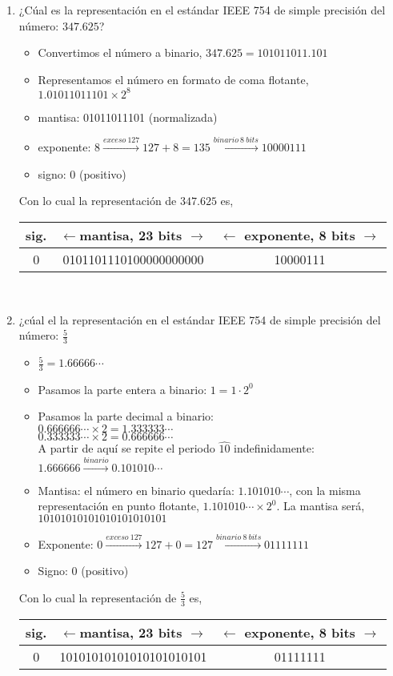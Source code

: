 \begin{enumerate}
\item ¿Cúal es la representación en el estándar IEEE 754 de simple precisión del número: $347.625$?
\begin{itemize}
\item  Convertimos el número a binario, $347.625 = 101011011.101$
\item Representamos el número en formato de coma flotante, $1.01011011101\times 2^{8}$
\item mantisa: 01011011101 (normalizada)
\item exponente: $8 \xrightarrow{exceso\ 127} 127+8=135  \xrightarrow{binario \ 8 \ bits} 10000111$
\item signo: 0 (positivo)
\end{itemize}
Con lo cual la representación de $347.625$ es, 

\begin{tabular}{|c||c||c|}
\hline
sig.&$\leftarrow$mantisa, 23 bits $\rightarrow$&$\leftarrow$ exponente, 8 bits $\rightarrow$\\
\hline
0&0101101110100000000000&10000111\\
\hline
\end{tabular}\\

\item ¿cúal el la representación en el estándar IEEE 754 de simple precisión del número: $\frac{5}{3}$
\begin{itemize}
\item $\frac{5}{3}=1.66666\cdots$
\item Pasamos la parte entera a binario: $1=1\cdot 2^0$
\item Pasamos la parte decimal a binario:\\
$0.666666\cdots\times 2=1.333333\cdots$\\
$0.333333\cdots\times 2=0.666666\cdots$\\
A partir de aquí se repite el periodo $\widehat{10}$ indefinidamente: $1.666666  \xrightarrow{binario} 0.101010\cdots$ 
\item Mantisa: el número en binario quedaría: $1.101010 \cdots$, con la misma representación en punto flotante, $1.101010\cdots \times 2^0$. La mantisa será, $10101010101010101010101$

\item Exponente: $0 \xrightarrow{exceso\ 127} 127+0=127  \xrightarrow{binario \ 8 \ bits} 01111111$
\item Signo: 0 (positivo)
\end{itemize}
Con lo cual la representación de $\frac{5}{3}$ es,

\begin{tabular}{|c||c||c|}
\hline
sig.&$\leftarrow$mantisa, 23 bits $\rightarrow$&$\leftarrow$ exponente, 8 bits $\rightarrow$\\
\hline
0&10101010101010101010101&01111111\\
\hline
\end{tabular}\\
\end{enumerate}

